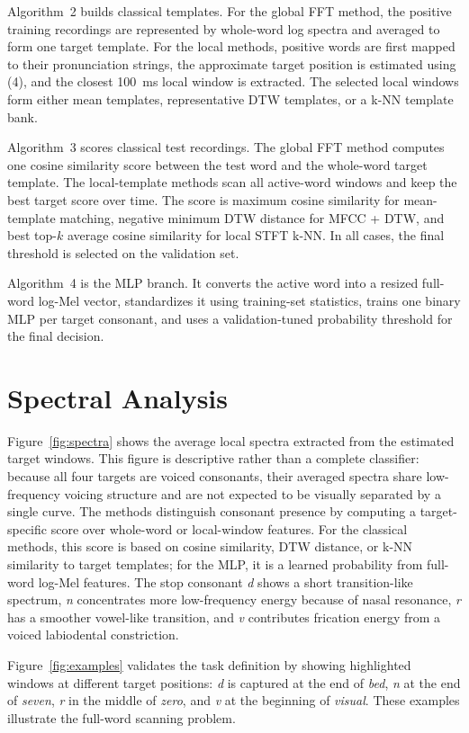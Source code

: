 \documentclass[conference]{IEEEtran}
\begin{document}
Algorithm~2 builds classical templates. For the global FFT method, the positive training recordings are represented by whole-word log spectra and averaged to form one target template. For the local methods, positive words are first mapped to their pronunciation strings, the approximate target position is estimated using (4), and the closest 100~ms local window is extracted. The selected local windows form either mean templates, representative DTW templates, or a k-NN template bank.

Algorithm~3 scores classical test recordings. The global FFT method computes one cosine similarity score between the test word and the whole-word target template. The local-template methods scan all active-word windows and keep the best target score over time. The score is maximum cosine similarity for mean-template matching, negative minimum DTW distance for MFCC + DTW, and best top-$k$ average cosine similarity for local STFT k-NN. In all cases, the final threshold is selected on the validation set.

Algorithm~4 is the MLP branch. It converts the active word into a resized full-word log-Mel vector, standardizes it using training-set statistics, trains one binary MLP per target consonant, and uses a validation-tuned probability threshold for the final decision.

\section{Spectral Analysis}
Figure~\ref{fig:spectra} shows the average local spectra extracted from the estimated target windows. This figure is descriptive rather than a complete classifier: because all four targets are voiced consonants, their averaged spectra share low-frequency voicing structure and are not expected to be visually separated by a single curve. The methods distinguish consonant presence by computing a target-specific score over whole-word or local-window features. For the classical methods, this score is based on cosine similarity, DTW distance, or k-NN similarity to target templates; for the MLP, it is a learned probability from full-word log-Mel features. The stop consonant \textit{d} shows a short transition-like spectrum, \textit{n} concentrates more low-frequency energy because of nasal resonance, \textit{r} has a smoother vowel-like transition, and \textit{v} contributes frication energy from a voiced labiodental constriction.

Figure~\ref{fig:examples} validates the task definition by showing highlighted windows at different target positions: \textit{d} is captured at the end of \textit{bed}, \textit{n} at the end of \textit{seven}, \textit{r} in the middle of \textit{zero}, and \textit{v} at the beginning of \textit{visual}. These examples illustrate the full-word scanning problem.
\end{document}
